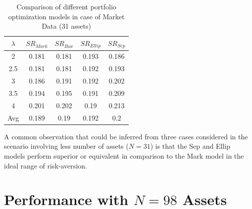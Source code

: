 \begin{table}[!h]
    \centering
    \captionsetup{justification=centering}
   \begin{tabular}{||c|c|c|c|c||}
   \hline
  
  
  $\lambda$ & $SR_{Mark}$ & $SR_{Box}$ & $SR_{Ellip}$ & $SR_{Sep}$ \\
  
  \hline
 2 & 0.181 & 0.181 & 0.193 & 0.186 \\
 2.5 & 0.181 & 0.181 & 0.192 & 0.193 \\
 3 & 0.186 & 0.191 & 0.192 & 0.202 \\
 3.5 & 0.194 & 0.195 & 0.191 & 0.209 \\
 4 & 0.201 & 0.202 & 0.19 & 0.213 \\
  \hline
  Avg & 0.189 & 0.19 & 0.192 & 0.2 \\
  \hline

\end{tabular}
    \caption{Comparison of different portfolio optimization models in case of Market Data (31 assets)}
    \label{tab:3}
\end{table}

A common observation that could be inferred from three cases considered in the scenario involving less number of assets ($N=31$) is that the Sep and Ellip models perform superior or equivalent in comparison to the Mark model in the ideal range of risk-aversion.


\section{Performance with $N=98$ Assets}

